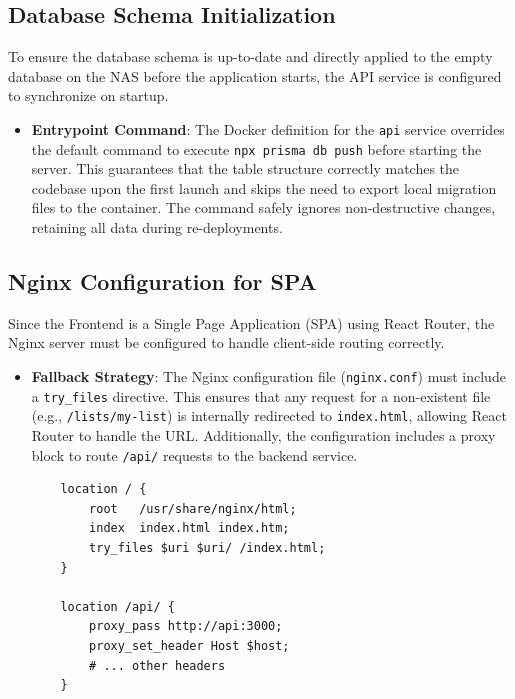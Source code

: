 \subsection{Database Schema Initialization}
To ensure the database schema is up-to-date and directly applied to the empty database on the NAS before the application starts, the API service is configured to synchronize on startup.
\begin{itemize}
    \item \textbf{Entrypoint Command}: The Docker definition for the \texttt{api} service overrides the default command to execute \texttt{npx prisma db push} before starting the server. This guarantees that the table structure correctly matches the codebase upon the first launch and skips the need to export local migration files to the container. The command safely ignores non-destructive changes, retaining all data during re-deployments.
\end{itemize}

\subsection{Nginx Configuration for SPA}
Since the Frontend is a Single Page Application (SPA) using React Router, the Nginx server must be configured to handle client-side routing correctly.
\begin{itemize}
  \item \textbf{Fallback Strategy}: The Nginx configuration file (\texttt{nginx.conf}) must include a \texttt{try\_files} directive. This ensures that any request for a non-existent file (e.g., \texttt{/lists/my-list}) is internally redirected to \texttt{index.html}, allowing React Router to handle the URL. Additionally, the configuration includes a proxy block to route \texttt{/api/} requests to the backend service.
    \begin{verbatim}
    location / {
        root   /usr/share/nginx/html;
        index  index.html index.htm;
        try_files $uri $uri/ /index.html;
    }

    location /api/ {
        proxy_pass http://api:3000;
        proxy_set_header Host $host;
        # ... other headers
    }
    \end{verbatim}
\end{itemize}

